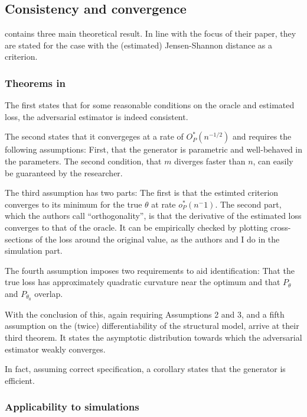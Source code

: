 \subsection{Consistency and convergence}
\label{sec:consistency_and_convergence}

\textcite{kaji2023adversarial} contains three main theoretical result.
In line with the focus of their paper, they are stated for the case with the (estimated) Jensen-Shannon distance as a criterion.

\subsubsection{Theorems in \cite{kaji2023adversarial}}
\label{sec:theorems_paper}

The first states that for some reasonable conditions on the oracle and estimated loss, the adversarial estimator is indeed consistent.

The second states that it convergeges at a rate of $O^{*}_P(n^{-1/2})$ and requires the following assumptions:
First, that the generator is parametric and well-behaved in the parameters.
The second condition, that $m$ diverges faster than $n$, can easily be guaranteed by the researcher.

The third assumption has two parts: The first is that the estimted criterion converges to its minimum for the true $\theta$ at rate $o^{*}_P(n^-1)$. %
The second part, which the authors call ``orthogonality'', %
is that the derivative of the estimated loss converges to that of the oracle. %
It can be empirically checked by plotting cross-sections of the loss around the original value, as the authors and I do in the simulation part.

The fourth assumption imposes two requirements to aid identification:
That the true loss has approximately quadratic curvature near the optimum and that $P_{\theta}$ and $P_{\theta_0}$ overlap.

With the conclusion of this, again requiring Assumptions 2 and 3, and a fifth assumption on the (twice) differentiability of the structural model, 
\textcite{kaji2023adversarial} arrive at their third theorem.
It states the asymptotic distribution towards which the adversarial estimator weakly converges.

In fact, assuming correct specification, a corollary states that the generator is efficient. %


\subsubsection{Applicability to simulations}
\label{sec:theoerem_simulation}

